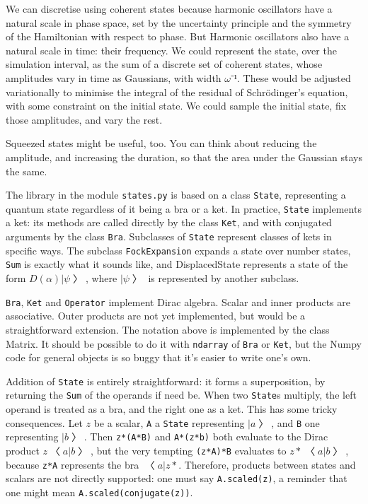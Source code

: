We can discretise using coherent states because harmonic oscillators have a natural scale in phase space, set by the uncertainty principle and the symmetry of the Hamiltonian with respect to phase.  But Harmonic oscillators also have a natural scale in time: their frequency.  We could represent the state, over the simulation interval, as the sum of a discrete set of coherent states, whose amplitudes vary in time as Gaussians, with width $ω⁻¹$.  These would be adjusted variationally to minimise the integral of the residual of Schrödinger's equation, with some constraint on the initial state.  We could sample the initial state, fix those amplitudes, and vary the rest.

Squeezed states might be useful, too.  You can think about reducing the amplitude, and increasing the duration, so that the area under the Gaussian stays the same.



The library in the module {\tt states.py} is based on a class {\tt State}, representing a quantum state regardless of it being a bra or a ket.  In practice, {\tt State} implements a ket: its methods are called directly by the class {\tt Ket}, and with conjugated arguments by the class {\tt Bra}.  Subclasses of {\tt State} represent classes of kets in specific ways.  The subclass {\tt FockExpansion} expands a state over number states, {\tt Sum} is exactly what it sounds like, and {DisplacedState} represents a state of the form $D(α)|ψ〉$, where $|ψ〉$ is represented by another subclass.

{\tt Bra}, {\tt Ket} and {\tt Operator} implement Dirac algebra.  Scalar and inner products are associative.  Outer products are not yet implemented, but would be a straightforward extension.  The notation above is implemented by the class {Matrix}.  It should be possible to do it with {\tt ndarray} of {\tt Bra} or {\tt Ket}, but the Numpy code for general objects is so buggy that it's easier to write one's own.

Addition of {\tt State} is entirely straightforward: it forms a superposition, by returning the {\tt Sum} of the operands if need be.  When two {\tt State}s multiply, the left operand is treated as a bra, and the right one as a ket.  This has some tricky consequences.  Let $z$ be a scalar, {\tt A} a {\tt State} representing $|a〉$, and {\tt B} one representing $|b〉$.  Then {\tt z*(A*B)} and {\tt A*(z*b)} both evaluate to the Dirac product $z〈a|b〉$, but the very tempting {\tt (z*A)*B} evaluates to $z*〈a|b〉$, because {\tt z*A} represents the bra $〈a|z*$.  Therefore, products between states and scalars are not directly supported: one must say {\tt A.scaled(z)}, a reminder that one might mean {\tt A.scaled(conjugate(z))}.

